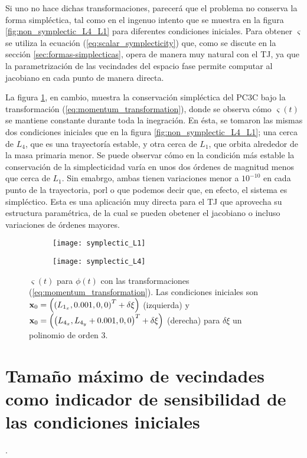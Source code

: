 Si uno no hace dichas transformaciones, parecerá que el problema no conserva la forma simpléctica, tal como en el ingenuo intento que se muestra en la figura \ref{fig:non_symplectic_L4_L1} para diferentes condiciones iniciales. Para obtener $\varsigma$ se utiliza la ecuación (\ref{eq:scalar_symplecticity}) que, como se discute en la sección \ref{sec:formas-simplecticas}, opera de manera muy natural con el TJ, ya que la parametrización de las vecindades del espacio fase permite computar al jacobiano en cada punto de manera directa.

La figura \ref{fig:symplectic_L4_L1}, en cambio, muestra la conservación simpléctica del PC3C bajo la transformación (\ref{eq:momentum_transformation}), donde se observa cómo $\varsigma(t)$ se mantiene constante durante toda la inegración. En ésta, se tomaron las mismas dos condiciones iniciales que en la figura \ref{fig:non_symplectic_L4_L1}; una cerca de $L_4$, que es una trayectoría estable, y otra cerca de $L_1$, que orbita alrededor de la masa primaria menor. Se puede observar cómo en la condición más estable la conservación de la simplecticidad varía en unos dos órdenes de magnitud menos que cerca de $L_1$. Sin emabrgo, ambas tienen variaciones menor a $10^{-10}$ en cada punto de la trayectoria, porl o que podemos decir que, en efecto, el sistema es simpléctico. Esta es una aplicación muy directa para el TJ que aprovecha su estructura paramétrica, de la cual se pueden obetener el jacobiano o incluso variaciones de órdenes mayores. 

\begin{figure}[h!]
\centering
\begin{subfigure}{0.49\textwidth}
	\centering
	\texttt{[image: symplectic\_L1]}
\end{subfigure}
%
\begin{subfigure}{0.49\textwidth}
	\centering
	\texttt{[image: symplectic\_L4]}
\end{subfigure}
\caption{$\varsigma(t)$ para $\phi(t)$ con las transformaciones (\ref{eq:momentum_transformation}). Las condiciones iniciales son $\mathbf{x}_0 = \left( \left( L_{1_x}, 0.001, 0, 0 \right)^T + \delta \xi \right) $ (izquierda) y $ \mathbf{x}_0 = \left( \left( L_{4_x}, L_{4_y} + 0.001, 0, 0 \right)^T + \delta \xi \right) $ (derecha) para $\delta \xi$ un polinomio de orden $3$.}
\label{fig:symplectic_L4_L1}
\end{figure}


\section{Tamaño máximo de vecindades como indicador de sensibilidad de las condiciones iniciales}

.